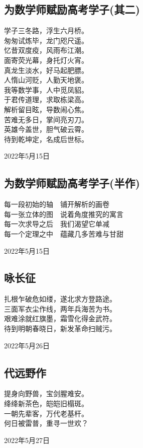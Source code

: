 \documentclass[a5paper]{ctexart}
\begin{document}
	\subsection{为数学师赋励高考学子(其二)}
	\begin{center}
		学子三冬路，浮生六月桥。\\
		匆匆试炼毕，龙门咫尺遥。\\
		忆昔双度疫，风雨布江潮。\\
		面寄荧光幕，身托灯火宵。\\
		真龙生淡水，好马起肥膘。\\
		人惰山河贬，人勤天地褒。\\
		我等数学事，人中觅凤貂。\\
		于君传道理，求取栋梁高。\\
		解析留目眩，导数闹心焦。\\
		苦难无多日，掌间亮刃刀。\\
		英雄今盖世，胆气破云霄。\\
		待到乾坤定，名成后世标。
		
	\end{center}
	\hfill 2022年5月15日
	
	\subsection{为数学师赋励高考学子(半作)}
	\begin{center}
		每一段初始的轴\ \ 铺开解析的画卷\\
		每一张立体的图\ \ 说着角度推究的寓言\\
		每一次求导之后\ \ 我们渴望它单减\\
		每一个定理之中\ \ 蕴藏几多苦难与甘甜
		
	\end{center}
	\hfill 2022年5月15日
	
	\subsection{咏长征}
	\begin{center}
		扎根乍破危如缕，遂北求方登路途。\\
		三面军衣尘作线，两年兵海苦为书。\\
		艰难涂就红旗墨，霜雪化得金武符。\\
		待到明朝春晓日，新发革命扫贼污。
	\end{center}
	\hfill 2022年5月26日
	
	\subsection{代远野作}
	\begin{center}
		提身向野兽，宝剑腥难安。\\
		绛绛新茶色，皑皑旧榻斑。\\
		一朝先辈客，万代老基杆。\\
		何日被雷普，重寻一世欢？
	\end{center}
	\hfill 2022年5月27日
	
\end{document}
